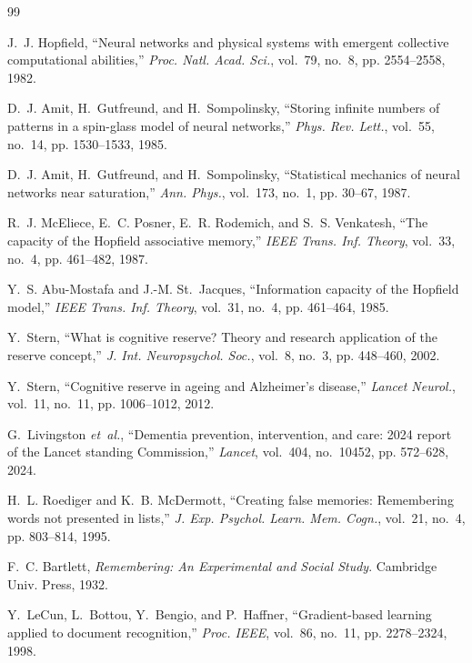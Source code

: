 \documentclass[11pt,a4paper]{article}
\begin{document}
\begin{thebibliography}{99}

J.~J. Hopfield, ``Neural networks and physical systems with emergent collective computational abilities,'' \emph{Proc. Natl. Acad. Sci.}, vol.~79, no.~8, pp. 2554--2558, 1982.

D.~J. Amit, H.~Gutfreund, and H.~Sompolinsky, ``Storing infinite numbers of patterns in a spin-glass model of neural networks,'' \emph{Phys. Rev. Lett.}, vol.~55, no.~14, pp. 1530--1533, 1985.

D.~J. Amit, H.~Gutfreund, and H.~Sompolinsky, ``Statistical mechanics of neural networks near saturation,'' \emph{Ann. Phys.}, vol.~173, no.~1, pp. 30--67, 1987.

R.~J. McEliece, E.~C. Posner, E.~R. Rodemich, and S.~S. Venkatesh, ``The capacity of the Hopfield associative memory,'' \emph{IEEE Trans. Inf. Theory}, vol.~33, no.~4, pp. 461--482, 1987.

Y.~S. Abu-Mostafa and J.-M. St.~Jacques, ``Information capacity of the Hopfield model,'' \emph{IEEE Trans. Inf. Theory}, vol.~31, no.~4, pp. 461--464, 1985.

Y.~Stern, ``What is cognitive reserve? Theory and research application of the reserve concept,'' \emph{J. Int. Neuropsychol. Soc.}, vol.~8, no.~3, pp. 448--460, 2002.

Y.~Stern, ``Cognitive reserve in ageing and Alzheimer's disease,'' \emph{Lancet Neurol.}, vol.~11, no.~11, pp. 1006--1012, 2012.

G.~Livingston \emph{et~al.}, ``Dementia prevention, intervention, and care: 2024 report of the Lancet standing Commission,'' \emph{Lancet}, vol.~404, no.~10452, pp. 572--628, 2024.

H.~L. Roediger and K.~B. McDermott, ``Creating false memories: Remembering words not presented in lists,'' \emph{J. Exp. Psychol. Learn. Mem. Cogn.}, vol.~21, no.~4, pp. 803--814, 1995.

F.~C. Bartlett, \emph{Remembering: An Experimental and Social Study}. Cambridge Univ. Press, 1932.

Y.~LeCun, L.~Bottou, Y.~Bengio, and P.~Haffner, ``Gradient-based learning applied to document recognition,'' \emph{Proc. IEEE}, vol.~86, no.~11, pp. 2278--2324, 1998.

\end{thebibliography}
\end{document}
